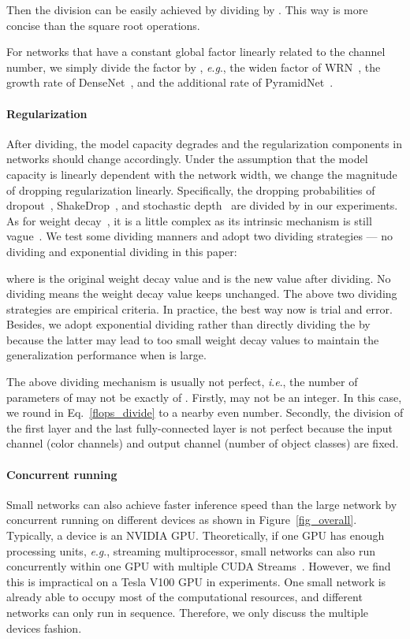 \documentclass[lettersize,journal]{IEEEtran}
\newcommand{\ie}{\textit{i}.\textit{e}.}
\newcommand{\eg}{\textit{e}.\textit{g}.}
\begin{document}
Then the division can be easily achieved by dividing  by .
This way is more concise than the square root operations.

For networks that have a constant global factor linearly related to the channel number, we simply divide the factor by ,
\eg, the widen factor of WRN~\cite{2016_WRN},
the growth rate of DenseNet~\cite{2017_densenet},
and the additional rate of PyramidNet~\cite{2017_PyramidNet}.



\paragraph{Regularization}
After dividing, the model capacity degrades
and the regularization components in networks should change accordingly.
Under the assumption that the model capacity is linearly dependent with
the network width, we change the magnitude
of dropping regularization linearly.
Specifically, the dropping probabilities of dropout~\cite{journals/jmlr/SrivastavaHKSS14},
ShakeDrop~\cite{2019_shakedrop}, and stochastic depth~\cite{conf/eccv/HuangSLSW16}
are divided by  in our experiments.
As for weight decay~\cite{KroghH91_wd}, it is a little complex as
its intrinsic mechanism is still vague~\cite{2019_ICLR_ZhangWXG19,conf/nips/GolatkarAS19}.
We test some dividing manners and adopt two dividing strategies ---
no dividing and exponential dividing in this paper:

where  is the original weight decay value and  is the new value after dividing.
No dividing means the weight decay value keeps unchanged.
The above two dividing strategies are empirical criteria.
In practice, the best way now is trial and error.
Besides, we adopt exponential dividing rather than directly dividing the
 by  because the latter may lead to too small weight decay values
to maintain the generalization performance when  is large.


The above dividing mechanism is usually not perfect, \ie,
the number of parameters of  may not be exactly  of .
Firstly,  may not be an integer.
In this case, we round  in Eq.~\eqref{flops_divide}
to a nearby even number.
Secondly, the division of the first layer and the
last fully-connected layer is not perfect because 
the input channel (color channels) and
output channel (number of object classes) are fixed.        

\paragraph{Concurrent running}
Small networks can also achieve faster inference
speed than the large network by concurrent running on different
devices as shown in Figure~\ref{fig_overall}. 
Typically, a device is an NVIDIA GPU. 
Theoretically, if one GPU has enough processing units, \eg,
streaming multiprocessor,
small networks can also run concurrently within one GPU
with multiple CUDA Streams~\cite{cuda_toolkit}.
However, we find this is impractical on a Tesla V100 GPU in experiments.
One small network is already able to occupy most of the computational resources,
and different networks can only run in sequence.
Therefore, we only discuss the multiple devices fashion.
\end{document}
